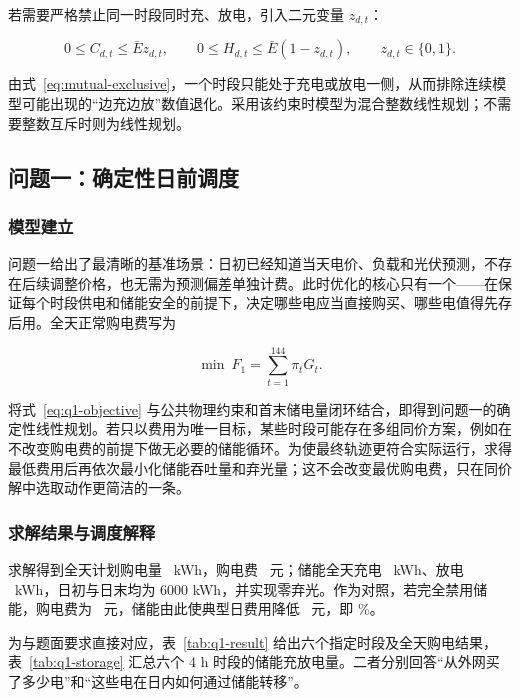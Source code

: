 若需要严格禁止同一时段同时充、放电，引入二元变量 $z_{d,t}$：

\begin{equation}
    0\le C_{d,t}\le\bar E z_{d,t},\qquad
    0\le H_{d,t}\le\bar E(1-z_{d,t}),
    \qquad z_{d,t}\in\{0,1\}.
    \label{eq:mutual-exclusive}
\end{equation}

由式~\eqref{eq:mutual-exclusive}，一个时段只能处于充电或放电一侧，从而排除连续模型可能出现的“边充边放”数值退化。采用该约束时模型为混合整数线性规划；不需要整数互斥时则为线性规划。

\subsection{问题一：确定性日前调度}

\subsubsection{模型建立}

问题一给出了最清晰的基准场景：日初已经知道当天电价、负载和光伏预测，不存在后续调整价格，也无需为预测偏差单独计费。此时优化的核心只有一个——在保证每个时段供电和储能安全的前提下，决定哪些电应当直接购买、哪些电值得先存后用。全天正常购电费写为

\begin{equation}
    \min\ F_1=\sum_{t=1}^{144}\pi_t G_t .
    \label{eq:q1-objective}
\end{equation}

将式~\eqref{eq:q1-objective} 与公共物理约束和首末储电量闭环结合，即得到问题一的确定性线性规划。若只以费用为唯一目标，某些时段可能存在多组同价方案，例如在不改变购电费的前提下做无必要的储能循环。为使最终轨迹更符合实际运行，求得最低费用后再依次最小化储能吞吐量和弃光量；这不会改变最优购电费，只在同价解中选取动作更简洁的一条。

\subsubsection{求解结果与调度解释}

求解得到全天计划购电量 \QoneEnergy\ kWh，购电费 \QoneCost\ 元；储能全天充电 \QoneCharge\ kWh、放电 \QoneDischarge\ kWh，日初与日末均为 $6000$ kWh，并实现零弃光。作为对照，若完全禁用储能，购电费为 \QoneNoStorage\ 元，储能由此使典型日费用降低 \QoneSave\ 元，即 \QoneSavePct\%。

为与题面要求直接对应，表~\ref{tab:q1-result} 给出六个指定时段及全天购电结果，表~\ref{tab:q1-storage} 汇总六个 $4$ h 时段的储能充放电量。二者分别回答“从外网买了多少电”和“这些电在日内如何通过储能转移”。

